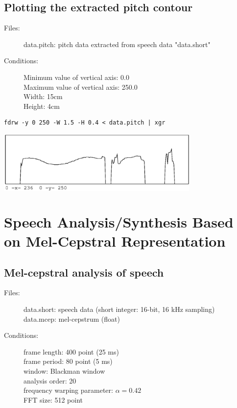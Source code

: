 \documentclass[a4paper]{article}
\begin{document}
\subsection{Plotting the extracted pitch contour}

\begin{description}
\item[Files:]
  data.pitch: pitch data extracted from speech data "data.short"
\item[Conditions:]
  Minimum value of vertical axis: 0.0\\
  Maximum value of vertical axis: 250.0\\
  Width: 15cm\\
  Height: 4cm
\end{description}

\begin{verbatim}
fdrw -y 0 250 -W 1.5 -H 0.4 < data.pitch | xgr
\end{verbatim}

\includegraphics[width=10cm]{data.pitch.fdrw.eps}

\section{Speech Analysis/Synthesis Based on Mel-Cepstral Representation}

\subsection{Mel-cepstral analysis of speech}

\begin{description}
\item[Files:]
  data.short: speech data (short integer: 16-bit, 16 kHz sampling)\\
  data.mcep: mel-cepstrum (float)
\item[Conditions:]
  frame length: 400 point (25 ms)\\
  frame period: 80 point (5 ms)\\
  window: Blackman window\\
  analysis order: 20\\
  frequency warping parameter: $\alpha = 0.42$\\
  FFT size: 512 point
\end{description}
\end{document}
